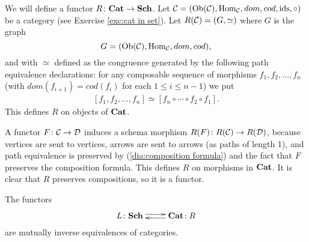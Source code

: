 \documentclass[CT4S-EN-RU]{subfiles}
\begin{document}
\begin{constructionRUS}
\end{constructionRUS}

\begin{constructionENG}
We will define a functor $R\colon{\mathbf{Cat}}\rightarrow{\mathbf{Sch}}$. Let $\mathcal{C}=(\textnormal{Ob}(\mathcal{C}),\textnormal{Hom}_\mathcal{C},dom,cod,\textnormal{ids},\circ)$ be a category (see Exercise \ref{exc:cat in set}). Let $R(\mathcal{C})=(G,\simeq)$ where $G$ is the graph $$G=(\textnormal{Ob}(\mathcal{C}),\textnormal{Hom}_\mathcal{C},dom,cod),$$ and with $\simeq$ defined as the congruence generated by the following path equivalence declarations: for any composable sequence of morphisms $f_1,f_2,\ldots,f_n$ (with $dom(f_{i+1})=cod(f_i)$ for each $1\leq i\leq n-1$) we put 
\begin{align}\label{dia:composition formula}
[f_1,f_2,\ldots,f_n]\simeq [f_n\circ\cdots\circ f_2\circ f_1].
\end{align} 
This defines $R$ on objects of ${\mathbf{Cat}}$. 

A functor $F\colon\mathcal{C}\rightarrow\mathcal{D}$ induces a schema morphism $R(F)\colon R(\mathcal{C})\rightarrow R(\mathcal{D})$, because vertices are sent to vertices, arrows are sent to arrows (as paths of length 1), and path equivalence is preserved by (\ref{dia:composition formula}) and the fact that $F$ preserves the composition formula. This defines $R$ on morphisms in ${\mathbf{Cat}}$. It is clear that $R$ preserves compositions, so it is a functor.
\end{constructionENG}

\begin{constructionRUS}
\end{constructionRUS}

\begin{theoremENG}\label{thm:equivalence of categories and schemas}
The functors $$\xymatrix{L\taking\Sch\ar@<.5ex>[r]&\Cat\!:R\ar@<.5ex>[l]}$$ are mutually inverse equivalences of categories.
\end{theoremENG}

\begin{theoremRUS}\label{thm:equivalence of categories and schemas}
\end{theoremRUS}
\end{document}
